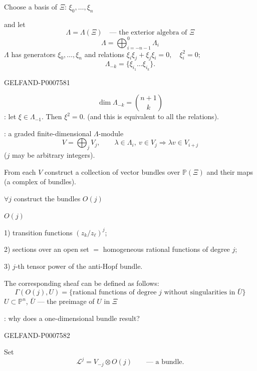Choose a basis of \(\Xi\): \(\xi_0,\ldots,\xi_n\)

and let
\[
\Lambda=\Lambda(\Xi)\quad\text{--- the exterior algebra of }\Xi
\]
\[
\Lambda=\bigoplus_{i=-n-1}^{0}\Lambda_i
\]
\(\Lambda\) has generators \(\xi_0,\ldots,\xi_n\) and relations
\(\xi_i\xi_j+\xi_j\xi_i=0,\quad\xi_i^2=0;\)
\[
\Lambda_{-k}=\{\xi_{i_1}\ldots\xi_{i_k}\}.
\]


\begin{GelfandAdjacentEvidence}{GELFAND-P000758}{1}

\[
\dim\Lambda_{-k}=\binom{n+1}{k}
\]
: let \(\xi\in\Lambda_{-1}\).
Then \(\xi^2=0\).
(and this is equivalent to all the relations).

: a graded finite-dimensional \(\Lambda\)-module
\[
V=\bigoplus_j V_j,\qquad
\lambda\in\Lambda_i,\ v\in V_j\Rightarrow\lambda v\in V_{i+j}
\]
(\(j\) may be arbitrary integers).

From each \(V\) construct a collection of vector bundles over \(\mathbb P(\Xi)\)
and their maps (a complex of bundles).

\(\forall j\) construct the bundles \(O(j)\)

 \(O(j)\)

1) transition functions \((z_k/z_\ell)^j\);

2) sections over an open set \(=\) homogeneous rational functions of degree \(j\);

3) \(j\)-th tensor power of the anti-Hopf bundle.

The corresponding sheaf can be defined as follows:
\[
\Gamma(O(j),U)=
\{\text{rational functions of degree }j\text{ without singularities in }\bar U\}
\]
\(U\subset\mathbb P^n\), \(\bar U\) --- the preimage of \(U\) in \(\Xi\)

: why does a one-dimensional bundle result?

\end{GelfandAdjacentEvidence}
\begin{GelfandAdjacentEvidence}{GELFAND-P000758}{2}


Set
\[
\mathcal L^j=V_{-j}\otimes O(j)\qquad\text{--- a bundle.}
\]
\end{GelfandAdjacentEvidence}
